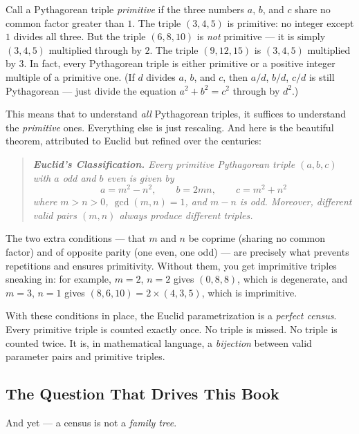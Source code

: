 Call a Pythagorean triple \textit{primitive} if the three numbers $a$, $b$, and $c$ share no common factor greater than $1$. The triple $(3, 4, 5)$ is primitive: no integer except $1$ divides all three. But the triple $(6, 8, 10)$ is \textit{not} primitive --- it is simply $(3, 4, 5)$ multiplied through by $2$. The triple $(9, 12, 15)$ is $(3, 4, 5)$ multiplied by $3$. In fact, every Pythagorean triple is either primitive or a positive integer multiple of a primitive one. (If $d$ divides $a$, $b$, and $c$, then $a/d$, $b/d$, $c/d$ is still Pythagorean --- just divide the equation $a^2 + b^2 = c^2$ through by $d^2$.)

This means that to understand \textit{all} Pythagorean triples, it suffices to understand the \textit{primitive} ones. Everything else is just rescaling. And here is the beautiful theorem, attributed to Euclid but refined over the centuries:

\begin{quote}
\itshape \textbf{Euclid's Classification.} Every primitive Pythagorean triple $(a, b, c)$ with $a$ odd and $b$ even is given by $$a = m^2 - n^2, \qquad b = 2mn, \qquad c = m^2 + n^2$$ where $m > n > 0$, $\gcd(m, n) = 1$, and $m - n$ is odd. Moreover, different valid pairs $(m, n)$ always produce different triples.
\end{quote}

The two extra conditions --- that $m$ and $n$ be coprime (sharing no common factor) and of opposite parity (one even, one odd) --- are precisely what prevents repetitions and ensures primitivity. Without them, you get imprimitive triples sneaking in: for example, $m = 2$, $n = 2$ gives $(0, 8, 8)$, which is degenerate, and $m = 3$, $n = 1$ gives $(8, 6, 10) = 2 \times (4, 3, 5)$, which is imprimitive.

With these conditions in place, the Euclid parametrization is a \textit{perfect census}. Every primitive triple is counted exactly once. No triple is missed. No triple is counted twice. It is, in mathematical language, a \textit{bijection} between valid parameter pairs and primitive triples.


\bigskip


\subsection*{The Question That Drives This Book}

And yet --- a census is not a \textit{family tree}.


